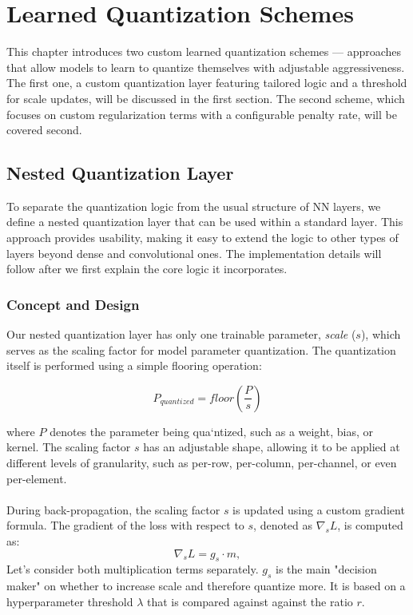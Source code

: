 \chapter{Learned Quantization\label{cha:chapter3} Schemes}
This chapter introduces two custom learned quantization schemes — approaches that allow models to learn to quantize themselves
with adjustable aggressiveness. The first one, a custom quantization layer featuring tailored logic and a threshold for scale updates,
will be discussed in the first section. The second scheme, which focuses on custom regularization terms with a configurable penalty rate,
will be covered second.


\section{Nested Quantization Layer}
\label{sec:customlayer}
To separate the quantization logic from the usual structure of NN layers,
we define a nested quantization layer that can be used within a standard layer. 
This approach provides usability, making it easy to extend the logic to other types of layers beyond dense and convolutional ones.
The implementation details will follow after we first explain the core logic it incorporates.


\subsection{Concept and Design}
\label{subsec:quantizeddense}
Our nested quantization layer has only one trainable parameter, \textit{scale} (\( s \)),
which serves as the scaling factor for model parameter quantization.
The quantization itself is performed using a simple flooring operation:

\[
  P_{quantized} = floor(\frac{P}{s})
\]

\noindent where \( P \) denotes the parameter being qua`ntized, such as a weight, bias, or kernel.
The scaling factor \( s \) has an adjustable shape, allowing it to be applied at different levels of granularity,
such as per-row, per-column, per-channel, or even per-element. 
\\
\\
During back-propagation, the scaling factor \( s \) is updated using a custom gradient formula. 
The gradient of the loss with respect to \( s \), denoted as \( \nabla_s L \), is computed as:
\[
\nabla_s L = g_s \cdot m,
\]
Let's consider both multiplication terms separately. \(  g_s  \) is the main "decision maker" on whether to
increase scale and therefore quantize more. It is based on a hyperparameter threshold  \(  \lambda  \)
that is compared against against the ratio \(  r  \).

